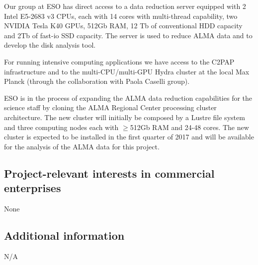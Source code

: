 \documentclass[10pt,fleqn,twoside]{article}
\begin{document}
Our group at ESO has direct access to a data reduction server
equipped with 2 Intel E5-2683 v3 CPUs, each with 14 cores with multi-thread capability, two
NVIDIA Tesla K40 GPUs, 512Gb RAM,
12 Tb of conventional HDD capacity and 2Tb of fast-io SSD capacity.
The server is used to reduce ALMA data and to develop the disk analysis tool.

For running intensive computing applications we have access to the C2PAP 
infrastructure and to the multi-CPU/multi-GPU Hydra cluster at the
local Max Planck (through the collaboration with Paola Caselli group).

ESO is in the process of expanding the ALMA data reduction capabilities for 
the science staff by
cloning the ALMA Regional Center processing cluster architecture. The new
cluster will initially be composed by a Lustre file system and three computing 
nodes each with $\ge$512Gb RAM and 24-48 cores. The new cluster is expected to be installed 
in the first quarter of 2017 and will be available 
for the analysis of the ALMA data for this project.

\subsection{Project-relevant interests in commercial enterprises}

None


\subsection{Additional information}

N/A
\end{document}
